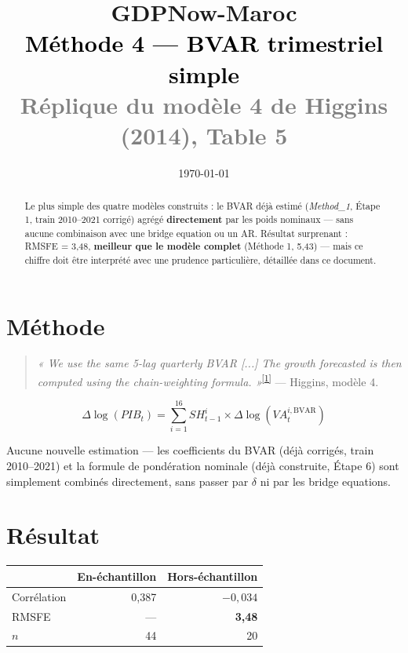 \documentclass[11pt,a4paper]{article}
\title{\vspace{-1.3cm}\textcolor{bleuprincip}{\Huge\bfseries GDPNow-Maroc}\\[0.3cm]
\textcolor{black}{\Large Méthode 4 --- BVAR trimestriel simple}\\[0.15cm]
\textcolor{gray}{\large Réplique du modèle 4 de Higgins (2014), Table 5}}
\author{}
\date{\today}
\newcommand{\cit}[1]{\textsuperscript{\hyperlink{ref#1}{[#1]}}}
\begin{document}
\maketitle
\thispagestyle{empty}

\begin{abstract}
\noindent Le plus simple des quatre modèles construits : le BVAR déjà estimé (\emph{Method\_1}, Étape 1, train 2010--2021 corrigé) agrégé \textbf{directement} par les poids nominaux --- sans aucune combinaison avec une bridge equation ou un AR. Résultat surprenant : RMSFE = 3,48, \textbf{meilleur que le modèle complet} (Méthode 1, 5,43) --- mais ce chiffre doit être interprété avec une prudence particulière, détaillée dans ce document.
\end{abstract}

\tableofcontents
\vspace{0.5cm}

\section{Méthode}

\begin{quote}
\textit{« We use the same 5-lag quarterly BVAR [...] The growth forecasted is then computed using the chain-weighting formula. »}\cit{1} --- Higgins, modèle 4.
\end{quote}

\begin{equation}
\Delta\log(PIB_t) = \sum_{i=1}^{16} SH_{t-1}^i \times \Delta\log(VA_t^{i,\text{BVAR}})
\end{equation}

Aucune nouvelle estimation --- les coefficients du BVAR (déjà corrigés, train 2010--2021) et la formule de pondération nominale (déjà construite, Étape 6) sont simplement combinés directement, sans passer par $\delta$ ni par les bridge equations.

\section{Résultat}

\begin{center}
\begin{tabular}{lrr}
\toprule
& \textbf{En-échantillon} & \textbf{Hors-échantillon} \\
\midrule
Corrélation & 0,387 & $-0{,}034$ \\
RMSFE & --- & \textbf{3,48} \\
$n$ & 44 & 20 \\
\bottomrule
\end{tabular}
\end{center}
\end{document}
